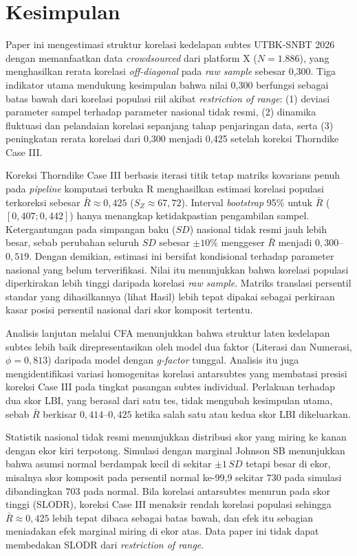 \section{Kesimpulan}

Paper ini mengestimasi struktur korelasi kedelapan subtes UTBK-SNBT 2026 dengan memanfaatkan data \textit{crowdsourced} dari platform X ($N=1.886$), yang menghasilkan rerata korelasi \textit{off-diagonal} pada \textit{raw sample} sebesar 0,300. Tiga indikator utama mendukung kesimpulan bahwa nilai 0,300 berfungsi sebagai batas bawah dari korelasi populasi riil akibat \textit{restriction of range}: (1) deviasi parameter sampel terhadap parameter nasional tidak resmi, (2) dinamika fluktuasi dan pelandaian korelasi sepanjang tahap penjaringan data, serta (3) peningkatan rerata korelasi dari 0,300 menjadi 0,425 setelah koreksi Thorndike Case III.

Koreksi Thorndike Case III berbasis iterasi titik tetap matriks kovarians penuh pada \textit{pipeline} komputasi terbuka R menghasilkan estimasi korelasi populasi terkoreksi sebesar $\bar{R} \approx 0,425$ ($S_Z \approx 67,72$). Interval \textit{bootstrap} 95\% untuk $\bar{R}$ ($[0,407; 0,442]$) hanya menangkap ketidakpastian pengambilan sampel. Ketergantungan pada simpangan baku ($SD$) nasional tidak resmi jauh lebih besar, sebab perubahan seluruh $SD$ sebesar $\pm 10\%$ menggeser $\bar{R}$ menjadi $0,300$--$0,519$. Dengan demikian, estimasi ini bersifat kondisional terhadap parameter nasional yang belum terverifikasi. Nilai itu menunjukkan bahwa korelasi populasi diperkirakan lebih tinggi daripada korelasi \textit{raw sample}. Matriks translasi persentil standar yang dihasilkannya (lihat Hasil) lebih tepat dipakai sebagai perkiraan kasar posisi persentil nasional dari skor komposit tertentu.

Analisis lanjutan melalui CFA menunjukkan bahwa struktur laten kedelapan subtes lebih baik direpresentasikan oleh model dua faktor (Literasi dan Numerasi, $\phi = 0,813$) daripada model dengan \textit{g-factor} tunggal. Analisis itu juga mengidentifikasi variasi homogenitas korelasi antarsubtes yang membatasi presisi koreksi Case III pada tingkat pasangan subtes individual. Perlakuan terhadap dua skor LBI, yang berasal dari satu tes, tidak mengubah kesimpulan utama, sebab $\bar{R}$ berkisar $0,414$--$0,425$ ketika salah satu atau kedua skor LBI dikeluarkan.

Statistik nasional tidak resmi menunjukkan distribusi skor yang miring ke kanan dengan ekor kiri terpotong. Simulasi dengan marginal Johnson SB menunjukkan bahwa asumsi normal berdampak kecil di sekitar $\pm 1\,SD$ tetapi besar di ekor, misalnya skor komposit pada persentil normal ke-99,9 sekitar $730$ pada simulasi dibandingkan $703$ pada normal. Bila korelasi antarsubtes menurun pada skor tinggi (SLODR), koreksi Case III menaksir rendah korelasi populasi sehingga $\bar{R} \approx 0,425$ lebih tepat dibaca sebagai batas bawah, dan efek itu sebagian meniadakan efek marginal miring di ekor atas. Data paper ini tidak dapat membedakan SLODR dari \textit{restriction of range}.

